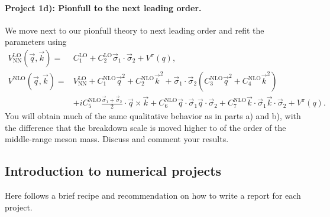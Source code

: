 \documentclass[%
oneside,                 %
final,                   %
10pt]{article}
\begin{document}
\paragraph{Project 1d): Pionfull to the next leading order.}
We move next to our pionfull theory to next leading order and refit the parameters using
\begin{align*}
V^\mathrm{LO}_\mathrm{NN}(\vec{q},\vec{k})=&C^\mathrm{LO}_1+C^\mathrm{LO}_2\vec{\sigma}_1\cdot\vec{\sigma}_2+V^{\pi}(q),\\
V^\mathrm{NLO}(\vec{q},\vec{k})=&V^\mathrm{LO}_\mathrm{NN}+C^\mathrm{NLO}_1\vec{q}^2+C^\mathrm{NLO}_2\vec{k}^2+
\vec{\sigma}_1\cdot\vec{\sigma}_2\left(C^\mathrm{NLO}_3\vec{q}^2+C^\mathrm{NLO}_4\vec{k}^2\right)\\
&+iC^\mathrm{NLO}_5\frac{\vec{\sigma}_1+\vec{\sigma}_2}{2}\cdot\vec{q}\times\vec{k}+C^\mathrm{NLO}_6\vec{q}\cdot\vec{\sigma}_1\vec{q}\cdot\vec{\sigma}_2
+C^\mathrm{NLO}_7\vec{k}\cdot\vec{\sigma}_1\vec{k}\cdot\vec{\sigma}_2+V^{\pi}(q).
\end{align*}
You will obtain much of  the same qualitative behavior as in parts a) and b), with the difference 
that the breakdown scale is 
moved higher to of the order of the middle-range meson mass. Discuss and comment your results.




\subsection*{Introduction to numerical projects}

Here follows a brief recipe and recommendation on how to write a report for each
project.
\end{document}
